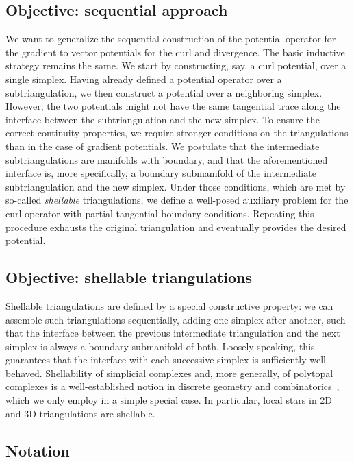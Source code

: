 \documentclass[10pt,a4paper]{article}
\begin{document}
\subsection{Objective: sequential approach} 
We want to generalize the sequential construction of the potential operator for the gradient to vector potentials for the curl and divergence. The basic inductive strategy remains the same. We start by constructing, say, a curl potential, over a single simplex. Having already defined a potential operator over a subtriangulation, we then construct a potential over a neighboring simplex. However, the two potentials might not have the same tangential trace along the interface between the subtriangulation and the new simplex. 
% 
To ensure the correct continuity properties, we require stronger conditions on the triangulations than in the case of gradient potentials. We postulate that the intermediate subtriangulations are manifolds with boundary, and that the aforementioned interface is, more specifically, a boundary submanifold of the intermediate subtriangulation and the new simplex. Under those conditions, which are met by so-called \textit{shellable} triangulations, we define a well-posed auxiliary problem for the curl operator with partial tangential boundary conditions. Repeating this procedure exhausts the original triangulation and eventually provides the desired potential.
\\

\subsection{Objective: shellable triangulations}
Shellable triangulations are defined by a special constructive property:
we can assemble such triangulations sequentially, adding one simplex after another, such that the interface between the previous intermediate triangulation and the next simplex is always a boundary submanifold of both.
Loosely speaking, this guarantees that the interface with each successive simplex is sufficiently well-behaved.
Shellability of simplicial complexes and, more generally, of polytopal complexes is a well-established notion in discrete geometry and combinatorics~\cite{ziegler1995lectures}, which we only employ in a simple special case. 
In particular, local stars in 2D and 3D triangulations are shellable. 






\subsection{Notation}
\end{document}
